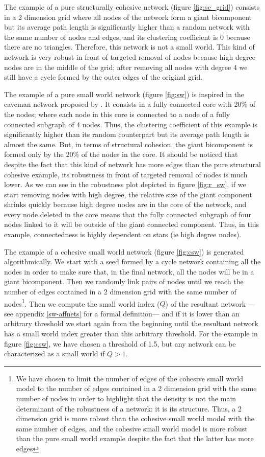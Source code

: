 The example of a pure structurally cohesive network (figure \ref{fig:sc_grid}) consists in a 2 dimension grid where all nodes of the network form a giant bicomponent but its average path length is significantly higher than a random network with the same number of nodes and edges, and its clustering coefficient is 0 because there are no triangles. Therefore, this network is not a small world. This kind of network is very robust in front of targeted removal of nodes because high degree nodes are in the middle of the grid; after removing all nodes with degree 4 we still have a cycle formed by the outer edges of the original grid.

The example of a pure small world network (figure \ref{fig:sw}) is inspired in the caveman network proposed by \cite{watts:1999}. It consists in a fully connected core with 20\% of the nodes; where each node in this core is connected to a node of a fully connected subgraph of 4 nodes. Thus, the clustering coefficient of this example is significantly higher than its random counterpart but its average path length is almost the same. But, in terms of structural cohesion, the giant bicomponent is formed only by the 20\% of the nodes in the core. It should be noticed that despite the fact that this kind of network has more edges than the pure structural cohesive example, its robustness in front of targeted removal of nodes is much lower. As we can see in the robustness plot depicted in figure \ref{fig:r_sw}, if we start removing nodes with high degree, the relative size of the giant component shrinks quickly because high degree nodes are in the core of the network, and every node deleted in the core means that the fully connected subgraph of four nodes linked to it will be outside of the giant connected component. Thus, in this example, connectedness is highly dependent on stars (ie high degree nodes).

The example of a cohesive small world network (figure \ref{fig:csw}) is generated algorithmically. We start with a seed formed by a cycle network containing all the nodes in order to make sure that, in the final network, all the nodes will be in a giant bicomponent. Then we randomly link pairs of nodes until we reach the number of edges contained in a 2 dimension grid with the same number of nodes\footnote{We have chosen to limit the number of edges of the cohesive small world model to the number of edges contained in a 2 dimension grid with the same number of nodes in order to highlight that the density is not the main determinant of the robustness of a network: it is its structure. Thus, a 2 dimension grid is more robust than the cohesive small world model with the same number of edges, and the cohesive small world model is more robust than the pure small world example despite the fact that the latter has more edges}. Then we compute the small world index ($Q$) of the resultant network ---see appendix \ref{sw-affnets} for a formal definition--- and if it is lower than an arbitrary threshold we start again from the beginning until the resultant network has a small world index greater than this arbitrary threshold. For the example in figure \ref{fig:csw}, we have chosen a threshold of 1.5, but any network can be characterized as a small world if $Q > 1$.

